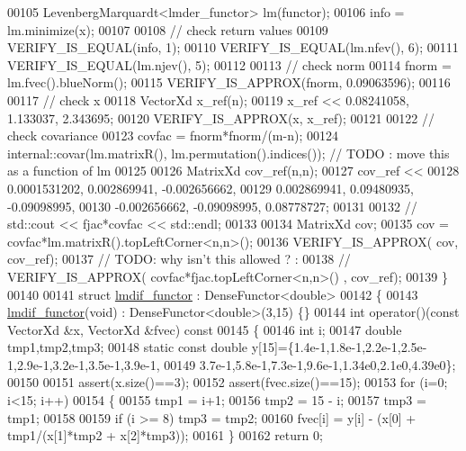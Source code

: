 \begin{DoxyCode}
00105   LevenbergMarquardt<lmder\_functor> lm(functor);
00106   info = lm.minimize(x);
00107 
00108   \textcolor{comment}{// check return values}
00109   VERIFY\_IS\_EQUAL(info, 1);
00110   VERIFY\_IS\_EQUAL(lm.nfev(), 6);
00111   VERIFY\_IS\_EQUAL(lm.njev(), 5);
00112 
00113   \textcolor{comment}{// check norm}
00114   fnorm = lm.fvec().blueNorm();
00115   VERIFY\_IS\_APPROX(fnorm, 0.09063596);
00116 
00117   \textcolor{comment}{// check x}
00118   VectorXd x\_ref(n);
00119   x\_ref << 0.08241058, 1.133037, 2.343695;
00120   VERIFY\_IS\_APPROX(x, x\_ref);
00121 
00122   \textcolor{comment}{// check covariance}
00123   covfac = fnorm*fnorm/(m-n);
00124   internal::covar(lm.matrixR(), lm.permutation().indices()); \textcolor{comment}{// TODO : move this as a function of lm}
00125 
00126   MatrixXd cov\_ref(n,n);
00127   cov\_ref <<
00128       0.0001531202,   0.002869941,  -0.002656662,
00129       0.002869941,    0.09480935,   -0.09098995,
00130       -0.002656662,   -0.09098995,    0.08778727;
00131 
00132 \textcolor{comment}{//  std::cout << fjac*covfac << std::endl;}
00133 
00134   MatrixXd cov;
00135   cov =  covfac*lm.matrixR().topLeftCorner<n,n>();
00136   VERIFY\_IS\_APPROX( cov, cov\_ref);
00137   \textcolor{comment}{// TODO: why isn't this allowed ? :}
00138   \textcolor{comment}{// VERIFY\_IS\_APPROX( covfac*fjac.topLeftCorner<n,n>() , cov\_ref);}
00139 \}
00140 
00141 \textcolor{keyword}{struct }\hyperlink{structlmdif__functor}{lmdif\_functor} : DenseFunctor<double>
00142 \{
00143     \hyperlink{structlmdif__functor}{lmdif\_functor}(\textcolor{keywordtype}{void}) : DenseFunctor<double>(3,15) \{\}
00144     \textcolor{keywordtype}{int} operator()(\textcolor{keyword}{const} VectorXd &x, VectorXd &fvec)\textcolor{keyword}{ const}
00145 \textcolor{keyword}{    }\{
00146         \textcolor{keywordtype}{int} i;
00147         \textcolor{keywordtype}{double} tmp1,tmp2,tmp3;
00148         \textcolor{keyword}{static} \textcolor{keyword}{const} \textcolor{keywordtype}{double} y[15]=\{1.4e-1,1.8e-1,2.2e-1,2.5e-1,2.9e-1,3.2e-1,3.5e-1,3.9e-1,
00149             3.7e-1,5.8e-1,7.3e-1,9.6e-1,1.34e0,2.1e0,4.39e0\};
00150 
00151         assert(x.size()==3);
00152         assert(fvec.size()==15);
00153         \textcolor{keywordflow}{for} (i=0; i<15; i++)
00154         \{
00155             tmp1 = i+1;
00156             tmp2 = 15 - i;
00157             tmp3 = tmp1;
00158 
00159             \textcolor{keywordflow}{if} (i >= 8) tmp3 = tmp2;
00160             fvec[i] = y[i] - (x[0] + tmp1/(x[1]*tmp2 + x[2]*tmp3));
00161         \}
00162         \textcolor{keywordflow}{return} 0;

\end{DoxyCode}
